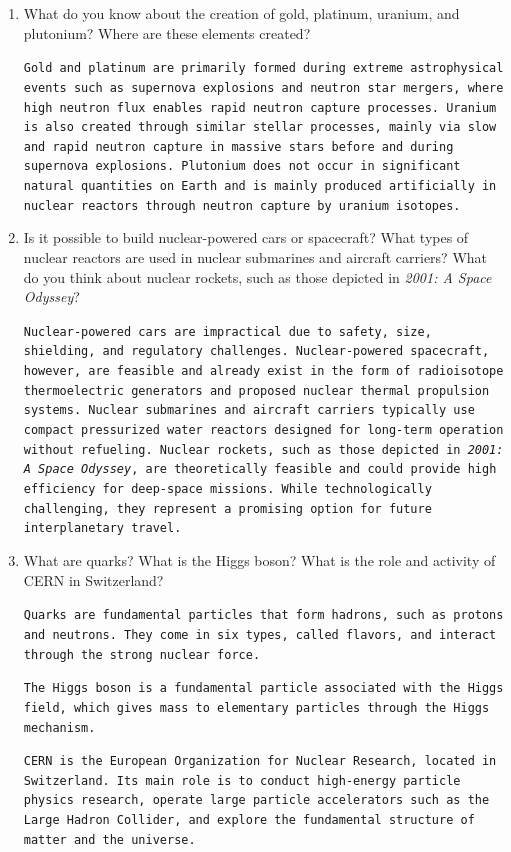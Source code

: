 \documentclass[a4paper,12pt]{letter}
\begin{document}
\begin{enumerate}
\item What do you know about the creation of gold, platinum, uranium, and plutonium? Where are these elements created?

\texttt{Gold and platinum are primarily formed during extreme astrophysical events such as supernova explosions and neutron star mergers, where high neutron flux enables rapid neutron capture processes. Uranium is also created through similar stellar processes, mainly via slow and rapid neutron capture in massive stars before and during supernova explosions. Plutonium does not occur in significant natural quantities on Earth and is mainly produced artificially in nuclear reactors through neutron capture by uranium isotopes.}
  
\item Is it possible to build nuclear-powered cars or spacecraft? What types of nuclear reactors are used in nuclear submarines and aircraft carriers? What do you think about nuclear rockets, such as those depicted in \emph{2001: A Space Odyssey}?

\texttt{Nuclear-powered cars are impractical due to safety, size, shielding, and regulatory challenges. Nuclear-powered spacecraft, however, are feasible and already exist in the form of radioisotope thermoelectric generators and proposed nuclear thermal propulsion systems. Nuclear submarines and aircraft carriers typically use compact pressurized water reactors designed for long-term operation without refueling. Nuclear rockets, such as those depicted in \emph{2001: A Space Odyssey}, are theoretically feasible and could provide high efficiency for deep-space missions. While technologically challenging, they represent a promising option for future interplanetary travel.}
  
\item What are quarks? What is the Higgs boson? What is the role and activity of CERN in Switzerland?

\texttt{Quarks are fundamental particles that form hadrons, such as protons and neutrons. They come in six types, called flavors, and interact through the strong nuclear force.}

\texttt{The Higgs boson is a fundamental particle associated with the Higgs field, which gives mass to elementary particles through the Higgs mechanism.}

\texttt{CERN is the European Organization for Nuclear Research, located in Switzerland. Its main role is to conduct high-energy particle physics research, operate large particle accelerators such as the Large Hadron Collider, and explore the fundamental structure of matter and the universe.}
  
\end{enumerate}


\bigskip


\vfill
\end{document}
